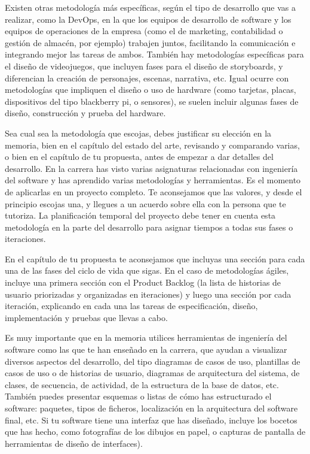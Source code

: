 Existen otras metodología más específicas, según el tipo de desarrollo que vas a realizar, como la DevOps, en la que los  equipos de desarrollo  de software y los equipos de operaciones de la empresa (como el de marketing, contabilidad o gestión de almacén, por ejemplo) trabajen juntos, facilitando la comunicación e integrando mejor las tareas de ambos. También hay metodologías específicas para el diseño de videojuegos, que incluyen fases para el diseño de storyboards, y diferencian la creación de personajes, escenas, narrativa, etc. Igual ocurre con metodologías que impliquen el diseño o uso de hardware (como tarjetas, placas, dispositivos del tipo blackberry pi, o sensores), se suelen incluir algunas fases de diseño, construcción y prueba del hardware. 

Sea cual sea la metodología que escojas, debes justificar su elección en la memoria, bien en el capítulo del estado del arte,  revisando y comparando varias, o bien en el capítulo de tu propuesta, antes de empezar a dar detalles del desarrollo. En la carrera has visto varias asignaturas relacionadas con ingeniería del software y has aprendido varias metodologías y herramientas. Es el momento de aplicarlas en un proyecto completo. Te aconsejamos que las valores, y desde el principio escojas una, y llegues a un acuerdo sobre ella con la persona que te tutoriza. La planificación temporal del proyecto debe tener en cuenta esta metodología en la parte del desarrollo para asignar tiempos a todas sus fases o iteraciones. 

En el capítulo de tu propuesta te aconsejamos que incluyas una sección para cada una de las fases del ciclo de vida que sigas. En el caso de metodologías ágiles, incluye una primera sección con el Product Backlog (la lista de historias de usuario priorizadas y organizadas en iteraciones) y luego una sección por cada iteración, explicando en cada una las tareas de especificación, diseño, implementación y pruebas que llevas a cabo.

Es muy importante que en la memoria utilices herramientas de ingeniería del software como las que te han enseñado en la carrera, que ayudan a visualizar diversos aspectos del desarrollo, del tipo diagramas de casos de uso, plantillas de casos de uso o de historias de usuario, diagramas de arquitectura del sistema, de clases, de secuencia, de actividad, de la estructura de la base de datos, etc. También puedes presentar esquemas o listas de cómo has estructurado el software: paquetes, tipos de ficheros, localización en la arquitectura del software final, etc. Si tu software tiene una interfaz que has diseñado, incluye los bocetos que has hecho, como fotografías de los dibujos en papel, o capturas de pantalla de herramientas de diseño de interfaces). 

